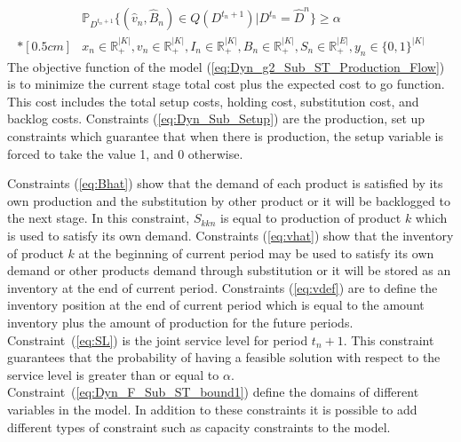 \documentclass[10pt]{article}
\newcommand{\ti}{t} %
\newcommand{\ka}{k} %
\newcommand{\KA}{K}
\newcommand{\jey}{j} %
\newcommand{\Bi}{B} %
\newcommand{\Vi}{v} %
\newcommand{\Es}{S} %
\begin{document}
\begin{subequations}
\begin{flalign}
\\
& \mathbb{P}_{D^{t_n+1}}\{ (\hat{\Vi}_{n}, \hat{\Bi}_{n}) \in Q(D^{\ti_n+1} )| D^{\ti_n} = \hat{D}^{n} \} \geq \alpha& \label{eq:SL}
& \\*[0.5cm]
& {x}_{ n } \in \mathbb{R}_{+}^{|\KA|} , {v}_{ n } \in \mathbb{R}_{+}^{|\KA|} ,  {I}_{ n } \in \mathbb{R}_{+}^{|\KA|} , {\Bi}_{ n } \in \mathbb{R}_{+}^{|\KA|} , {S}_{n} \in \mathbb{R}_{+}^{|E|} ,{y}_{ n } \in \{0,1\}^{|\KA|} &  & \label{eq:Dyn_F_Sub_ST_bound1}
\end{flalign}
\end{subequations}
The objective function of the model (\ref{eq:Dyn_g2_Sub_ST_Production_Flow}) is to minimize the current stage total cost plus the expected cost to go function. This cost includes the total setup costs, holding cost, substitution cost, and backlog costs.
Constraints (\ref{eq:Dyn_Sub_Setup}) are the production, set up constraints which guarantee that when there is production, the setup variable is forced to take the value 1, and 0 otherwise. 

Constraints (\ref{eq:Bhat}) show that the demand of each product is satisfied by its own production and the substitution by other product or it will be backlogged to the next stage. In this constraint, $\Es_{\ka \ka n}$ is equal to production of product $k$ which is used to satisfy its own demand. Constraints (\ref{eq:vhat}) show that the inventory of product $\ka$ at the beginning of current period may be used to satisfy its own demand or other products demand through substitution or it will be stored as an inventory at the end of current period. Constraints (\ref{eq:vdef}) are to define the inventory position at the end of current period which is equal to the amount inventory plus the amount of production for the future periods. Constraint~(\ref{eq:SL}) is the joint service level for period $\ti_n+1$. This constraint guarantees that the probability of having a feasible solution with respect to the service level is greater than or equal to $\alpha$.  Constraint~(\ref{eq:Dyn_F_Sub_ST_bound1}) define the domains of different variables in the model. In addition to these constraints it is possible to add different types of constraint such as capacity constraints to the model.
\end{document}
